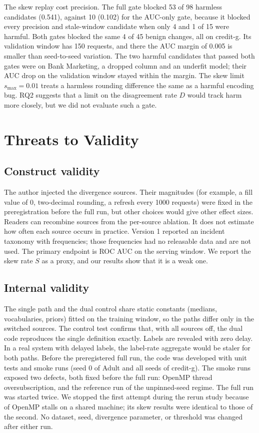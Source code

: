 \documentclass[journal]{IEEEtran}
\begin{document}
The skew replay cost precision. The full gate blocked 53 of 98 harmless candidates (0.541), against 10 (0.102) for the AUC-only gate, because it blocked every precision and stale-window candidate when only 4 and 1 of 15 were harmful. Both gates blocked the same 4 of 45 benign changes, all on credit-g. Its validation window has 150 requests, and there the AUC margin of 0.005 is smaller than seed-to-seed variation. The two harmful candidates that passed both gates were on Bank Marketing, a dropped column and an underfit model; their AUC drop on the validation window stayed within the margin. The skew limit $s_{\max}=0.01$ treats a harmless rounding difference the same as a harmful encoding bug. RQ2 suggests that a limit on the disagreement rate $D$ would track harm more closely, but we did not evaluate such a gate.

\section{Threats to Validity}
\label{sec:threats}

\subsection{Construct validity}
The author injected the divergence sources. Their magnitudes (for example, a fill value of 0, two-decimal rounding, a refresh every 1000 requests) were fixed in the preregistration before the full run, but other choices would give other effect sizes. Readers can recombine sources from the per-source ablation. It does not estimate how often each source occurs in practice. Version 1 reported an incident taxonomy with frequencies; those frequencies had no releasable data and are not used. The primary endpoint is ROC AUC on the serving window. We report the skew rate $S$ as a proxy, and our results show that it is a weak one.

\subsection{Internal validity}
The single path and the dual control share static constants (medians, vocabularies, priors) fitted on the training window, so the paths differ only in the switched sources. The control test confirms that, with all sources off, the dual code reproduces the single definition exactly. Labels are revealed with zero delay. In a real system with delayed labels, the label-rate aggregate would be staler for both paths. Before the preregistered full run, the code was developed with unit tests and smoke runs (seed 0 of Adult and all seeds of credit-g). The smoke runs exposed two defects, both fixed before the full run: OpenMP thread oversubscription, and the reference run of the unpinned-seed regime. The full run was started twice. We stopped the first attempt during the rerun study because of OpenMP stalls on a shared machine; its skew results were identical to those of the second. No dataset, seed, divergence parameter, or threshold was changed after either run.
\end{document}
